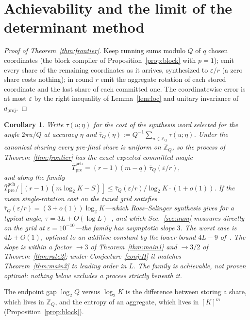 \documentclass[aps,prx,twocolumn,superscriptaddress,nofootinbib,longbibliography]{revtex4-2}
\theoremstyle{plain}
\newtheorem{corollary}{Corollary}
\theoremstyle{definition}
\theoremstyle{remark}
\newcommand{\dproj}{d_{\mathrm{proj}}}
\newcommand{\Tpre}{T_{\mathrm{pre}}}
\newcommand{\Z}{\mathbb{Z}}
\begin{document}
\section{Achievability and the limit of the determinant method}\label{app:frontier}

\begin{proof}[Proof of Theorem~\ref{thm:frontier}]
Keep running sums modulo $Q$ of $q$ chosen coordinates (the block compiler of Proposition~\ref{prop:block} with $p=1$); emit every share of the remaining coordinates as it arrives, synthesized to $\varepsilon/r$ (a zero share costs nothing); in round $r$ emit the aggregate rotation of each stored coordinate and the last share of each committed one. The coordinatewise error is at most $\varepsilon$ by the right inequality of Lemma~\ref{lem:loc} and unitary invariance of $\dproj$.
\end{proof}

\begin{corollary}\label{cor:frontier}
Write $\tau(u;\eta)$ for the cost of the synthesis word selected for the angle $2\pi u/Q$ at accuracy $\eta$ and $\bar\tau_Q(\eta):=Q^{-1}\sum_{u\in\Z_Q}\tau(u;\eta)$. Under the canonical sharing every pre-final share is uniform on $\Z_Q$, so the process of Theorem~\ref{thm:frontier} has the exact expected committed magic
\begin{equation}\label{eq:achexp}
\bar\Tpre^{\mathrm{ach}}=(r-1)(m-q)\,\bar\tau_Q(\varepsilon/r),
\end{equation}
and along the family $\bar\Tpre^{\mathrm{ach}}/[(r-1)(m\log_2K-S)]\le\bar\tau_Q(\varepsilon/r)/\log_2K\cdot(1+o(1))$. If the mean single-rotation cost on the tuned grid satisfies $\bar\tau_Q(\varepsilon/r)=(3+o(1))\log_2K$---which Ross--Selinger synthesis gives for a typical angle, $\tau=3L+O(\log L)$~\cite{RossSelinger}, and which Sec.~\ref{sec:num} measures directly on the grid at $\varepsilon=10^{-10}$---the family has asymptotic slope $3$. The worst case is $4L+O(1)$, optimal to an additive constant by the lower bound $4L-9$ of~\cite[Thm.~30]{Selinger15}. The slope is within a factor $\to3$ of Theorem~\ref{thm:main1} and $\to3/2$ of Theorem~\ref{thm:rate2}; under Conjecture~\ref{conj:H} it matches Theorem~\ref{thm:main2} to leading order in $L$. The family is achievable, not proven optimal: nothing below excludes a process strictly beneath it.
\end{corollary}
The endpoint gap $\log_2Q$ versus $\log_2K$ is the difference between storing a share, which lives in $\Z_Q$, and the entropy of an aggregate, which lives in $[K]^m$ (Proposition~\ref{prop:block}).
\end{document}
